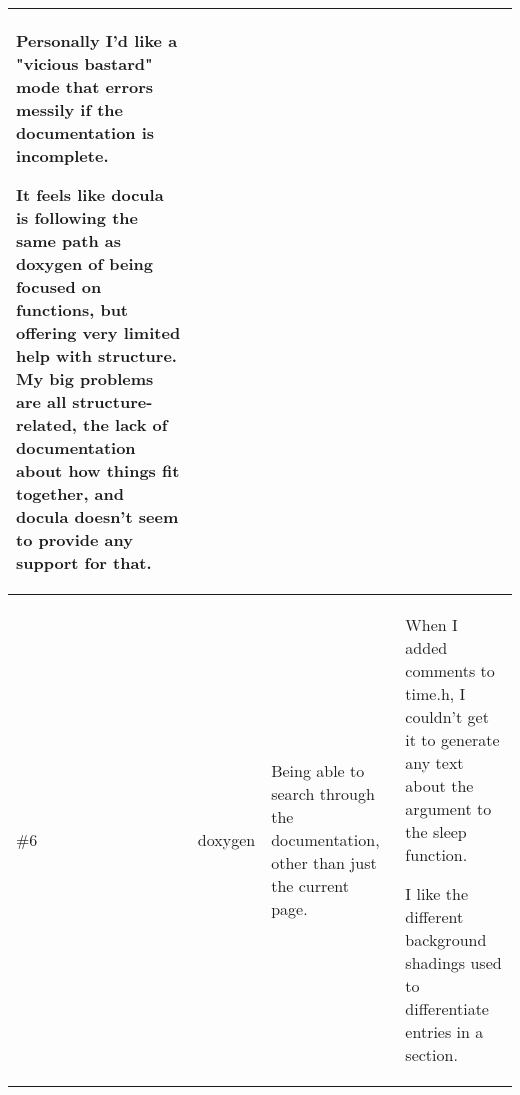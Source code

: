\begin{landscape}
\begin{center}
\begin{longtable}{l || p{3cm} | p{7cm} | p{8cm}}
      Personally I'd like a "vicious bastard" mode that errors messily if the
      documentation is incomplete.

      It feels like docula is following the same path as doxygen of being
      focused on functions, but offering very limited help with structure. My
      big problems are all structure-related, the lack of documentation about
      how things fit together, and docula doesn't seem to provide any support
      for that. \\
\hline
  \#6
    & doxygen
    & Being able to search through the documentation, other than just the
      current page.
    & When I added comments to time.h, I couldn't get it to generate any text
      about the argument to the sleep function.

      I like the different background shadings used to differentiate entries in
      a section. \\
\end{longtable}
\end{center}
\end{landscape}
